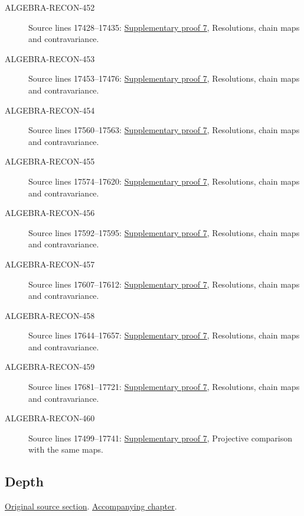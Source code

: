 \begin{description}
\item[ALGEBRA-RECON-452] Source lines 17428--17435: \hyperlink{algebra_blowup_ext_depth_notes_20260927}{Supplementary proof 7}, Resolutions, chain maps and contravariance.
\item[ALGEBRA-RECON-453] Source lines 17453--17476: \hyperlink{algebra_blowup_ext_depth_notes_20260927}{Supplementary proof 7}, Resolutions, chain maps and contravariance.
\item[ALGEBRA-RECON-454] Source lines 17560--17563: \hyperlink{algebra_blowup_ext_depth_notes_20260927}{Supplementary proof 7}, Resolutions, chain maps and contravariance.
\item[ALGEBRA-RECON-455] Source lines 17574--17620: \hyperlink{algebra_blowup_ext_depth_notes_20260927}{Supplementary proof 7}, Resolutions, chain maps and contravariance.
\item[ALGEBRA-RECON-456] Source lines 17592--17595: \hyperlink{algebra_blowup_ext_depth_notes_20260927}{Supplementary proof 7}, Resolutions, chain maps and contravariance.
\item[ALGEBRA-RECON-457] Source lines 17607--17612: \hyperlink{algebra_blowup_ext_depth_notes_20260927}{Supplementary proof 7}, Resolutions, chain maps and contravariance.
\item[ALGEBRA-RECON-458] Source lines 17644--17657: \hyperlink{algebra_blowup_ext_depth_notes_20260927}{Supplementary proof 7}, Resolutions, chain maps and contravariance.
\item[ALGEBRA-RECON-459] Source lines 17681--17721: \hyperlink{algebra_blowup_ext_depth_notes_20260927}{Supplementary proof 7}, Resolutions, chain maps and contravariance.
\item[ALGEBRA-RECON-460] Source lines 17499--17741: \hyperlink{algebra_blowup_ext_depth_notes_20260927}{Supplementary proof 7}, Projective comparison with the same maps.
\end{description}

\subsection{Depth}
\hypertarget{algebra-source-section-depth}{}
\noindent\href{https://github.com/stacks/stacks-project/blob/a04446e57ec1fbc252a871afcec7752fb2807b14/algebra.tex\#L17759}{Original source section}. \href{algebra.pdf\#nameddest=section-depth}{Accompanying chapter}.

